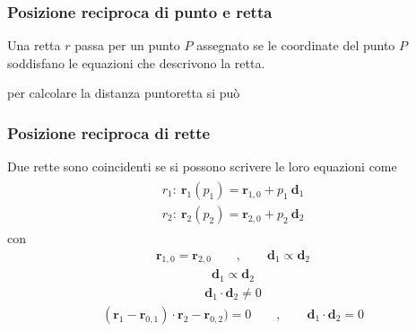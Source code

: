 \documentclass[letterpaper,10pt,english]{jupyterBook}
\begin{document}
\subsubsection{Posizione reciproca di punto e retta}
\label{\detokenize{ch/analytic_geometry/analytic_geometry_2d/lines:posizione-reciproca-di-punto-e-retta}}
\sphinxAtStartPar
{} Una retta \(r\) passa per un punto \(P\) assegnato se le coordinate del punto \(P\) soddisfano le equazioni che descrivono la retta.

\sphinxAtStartPar
{} per calcolare la distanza punto\sphinxhyphen{}retta si può


\subsubsection{Posizione reciproca di rette}
\label{\detokenize{ch/analytic_geometry/analytic_geometry_2d/lines:posizione-reciproca-di-rette}}
\sphinxAtStartPar
{} Due rette sono coincidenti se si possono scrivere le loro equazioni come
\begin{equation*}
\begin{split}\begin{aligned}
  r_1: \ \mathbf{r}_1(p_1) = \mathbf{r}_{1,0} + p_1 \ \mathbf{d}_1 \\
  r_2: \ \mathbf{r}_2(p_2) = \mathbf{r}_{2,0} + p_2 \ \mathbf{d}_2
\end{aligned}\end{split}
\end{equation*}
\sphinxAtStartPar
con
\begin{equation*}
\begin{split}\mathbf{r}_{1,0} = \mathbf{r}_{2,0} \qquad , \qquad \mathbf{d}_1 \propto \mathbf{d}_2\end{split}
\end{equation*}
\sphinxAtStartPar
{}
\begin{equation*}
\begin{split}\mathbf{d}_1 \propto \mathbf{d}_2\end{split}
\end{equation*}
\sphinxAtStartPar
{}
\begin{equation*}
\begin{split}\mathbf{d}_1 \cdot \mathbf{d}_2 \ne 0\end{split}
\end{equation*}
\sphinxAtStartPar
{}
\begin{equation*}
\begin{split}(\mathbf{r}_1 - \mathbf{r}_{0,1}) \cdot \mathbf{r}_2 - \mathbf{r}_{0,2}) = 0 \qquad , \qquad \mathbf{d}_1 \cdot \mathbf{d}_2 = 0\end{split}
\end{equation*}
\end{document}
